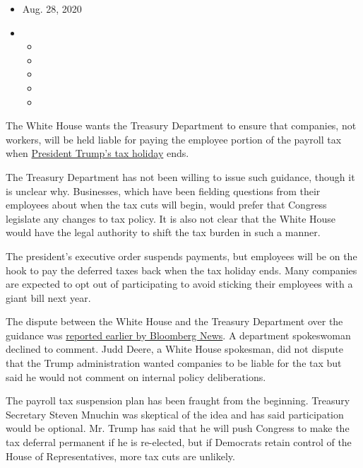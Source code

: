 \begin{itemize}
\item
  Aug. 28, 2020
\item
  \begin{itemize}
  \item
  \item
  \item
  \item
  \item
  \end{itemize}
\end{itemize}

The White House wants the Treasury Department to ensure that companies,
not workers, will be held liable for paying the employee portion of the
payroll tax when
\href{https://www.nytimes3xbfgragh.onion/2020/08/10/business/economy/trump-payroll-tax-holiday.html}{President
Trump's tax holiday} ends.

The Treasury Department has not been willing to issue such guidance,
though it is unclear why. Businesses, which have been fielding questions
from their employees about when the tax cuts will begin, would prefer
that Congress legislate any changes to tax policy. It is also not clear
that the White House would have the legal authority to shift the tax
burden in such a manner.

The president's executive order suspends payments, but employees will be
on the hook to pay the deferred taxes back when the tax holiday ends.
Many companies are expected to opt out of participating to avoid
sticking their employees with a giant bill next year.

The dispute between the White House and the Treasury Department over the
guidance was
\href{https://www.bloomberg.com/news/articles/2020-08-27/white-house-holding-up-guidance-on-trump-s-payroll-tax-deferral}{reported
earlier by Bloomberg News}. A department spokeswoman declined to
comment. Judd Deere, a White House spokesman, did not dispute that the
Trump administration wanted companies to be liable for the tax but said
he would not comment on internal policy deliberations.

The payroll tax suspension plan has been fraught from the beginning.
Treasury Secretary Steven Mnuchin was skeptical of the idea and has said
participation would be optional. Mr. Trump has said that he will push
Congress to make the tax deferral permanent if he is re-elected, but if
Democrats retain control of the House of Representatives, more tax cuts
are unlikely.

